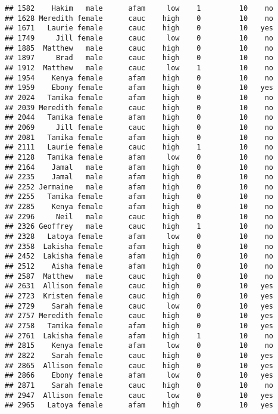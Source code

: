 \documentclass[
]{article}
\begin{document}
\begin{verbatim}
## 1582    Hakim   male      afam     low    1         10    no
## 1628 Meredith female      cauc    high    0         10    no
## 1671   Laurie female      cauc    high    0         10   yes
## 1749     Jill female      cauc     low    0         10    no
## 1885  Matthew   male      cauc    high    0         10    no
## 1897     Brad   male      cauc    high    0         10    no
## 1912  Matthew   male      cauc     low    1         10    no
## 1954    Kenya female      afam    high    0         10    no
## 1959    Ebony female      afam    high    0         10   yes
## 2024   Tamika female      afam    high    0         10    no
## 2039 Meredith female      cauc    high    0         10    no
## 2044   Tamika female      afam    high    0         10    no
## 2069     Jill female      cauc    high    0         10    no
## 2081   Tamika female      afam    high    0         10    no
## 2111   Laurie female      cauc    high    1         10    no
## 2128   Tamika female      afam     low    0         10    no
## 2164    Jamal   male      afam    high    0         10    no
## 2235    Jamal   male      afam    high    0         10    no
## 2252 Jermaine   male      afam    high    0         10    no
## 2255   Tamika female      afam    high    0         10    no
## 2285    Kenya female      afam    high    0         10    no
## 2296     Neil   male      cauc    high    0         10    no
## 2326 Geoffrey   male      cauc    high    1         10    no
## 2328   Latoya female      afam     low    0         10    no
## 2358  Lakisha female      afam    high    0         10    no
## 2452  Lakisha female      afam    high    0         10    no
## 2512    Aisha female      afam    high    0         10    no
## 2587  Matthew   male      cauc    high    0         10    no
## 2631  Allison female      cauc    high    0         10   yes
## 2723  Kristen female      cauc    high    0         10   yes
## 2729    Sarah female      cauc     low    0         10   yes
## 2757 Meredith female      cauc    high    0         10   yes
## 2758   Tamika female      afam    high    0         10   yes
## 2761  Lakisha female      afam    high    1         10    no
## 2815    Kenya female      afam     low    0         10    no
## 2822    Sarah female      cauc    high    0         10   yes
## 2865  Allison female      cauc    high    0         10   yes
## 2866    Ebony female      afam     low    0         10   yes
## 2871    Sarah female      cauc    high    0         10    no
## 2947  Allison female      cauc     low    0         10   yes
## 2965   Latoya female      afam    high    0         10   yes

\end{verbatim}
\end{document}
